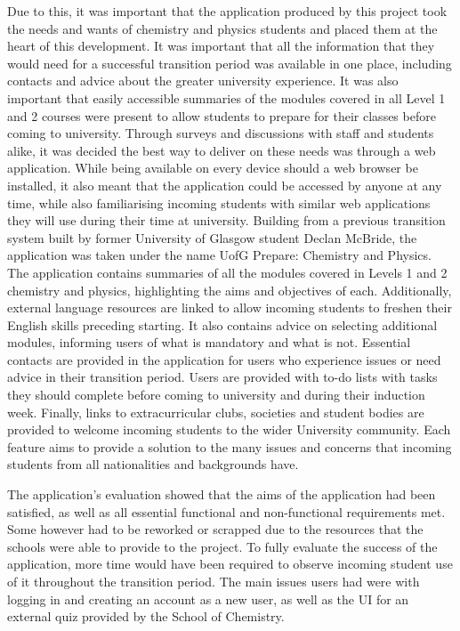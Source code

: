 \documentclass{l4proj}
\begin{document}
Due to this,  it was important that the application produced by this project took the needs and wants of chemistry and physics students and placed them at the heart of this development. It was important that all the information that they would need for a successful transition period was available in one place,  including contacts and advice about the greater university experience. It was also important that easily accessible summaries of the modules covered in all Level 1 and 2 courses were present to allow students to prepare for their classes before coming to university. Through surveys and discussions with staff and students alike,  it was decided the best way to deliver on these needs was through a web application. While being available on every device should a web browser be installed,  it also meant that the application could be accessed by anyone at any time,  while also familiarising incoming students with similar web applications they will use during their time at university. Building from a previous transition system built by former University of Glasgow student Declan McBride,  the application was taken under the name UofG Prepare: Chemistry and Physics. The application contains summaries of all the modules covered in Levels 1 and 2 chemistry and physics,  highlighting the aims and objectives of each. Additionally,  external language resources are linked to allow incoming students to freshen their English skills preceding starting. It also contains advice on selecting additional modules,  informing users of what is mandatory and what is not. Essential contacts are provided in the application for users who experience issues or need advice in their transition period. Users are provided with to-do lists with tasks they should complete before coming to university and during their induction week. Finally,  links to extracurricular clubs,  societies and student bodies are provided to welcome incoming students to the wider University community. Each feature aims to provide a solution to the many issues and concerns that incoming students from all nationalities and backgrounds have.

The application's evaluation showed that the aims of the application had been satisfied,  as well as all essential functional and non-functional requirements met. Some however had to be reworked or scrapped due to the resources that the schools were able to provide to the project. To fully evaluate the success of the application,  more time would have been required to observe incoming student use of it throughout the transition period. The main issues users had were with logging in and creating an account as a new user,  as well as the UI for an external quiz provided by the School of Chemistry.
\end{document}
